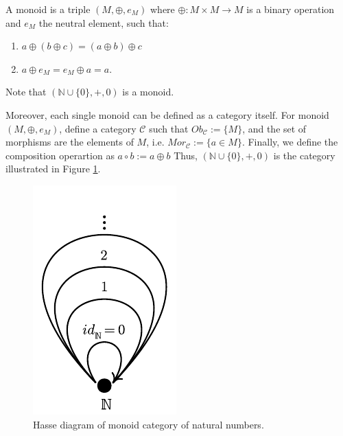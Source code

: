\begin{example}[Monoids]
	A monoid is a triple $(M, \oplus, e_M)$ where $\oplus:M\times M \to M$ is a binary operation
	and $e_M$ the neutral element, such that:
	\begin{enumerate}
		\item $a \oplus (b \oplus c) = (a \oplus b) \oplus c$
		\item $a \oplus e_M = e_M \oplus a = a$.
	\end{enumerate}
	Note that $(\mathbb N \cup\{ 0\}, +, 0)$ is a monoid.

	Moreover, each single monoid can be defined as a category itself. For
	monoid $(M, \oplus, e_M)$, define a category $\mathcal C$
	such that $Ob_\mathcal C := \{M\}$, and the set of morphisms
	are the elements of $M$, i.e.
	$Mor_\mathcal C := \{a \in M\}$. Finally, we define the composition
	operartion as $a \circ b := a \oplus b$
	Thus, $(\mathbb N \cup \{0\}, +, 0)$ is the category illustrated in
	Figure \ref{fig:NMonoid}.

	\begin{figure}[H]
		\begin{center}
			\includegraphics{./notebooks/NMonoid}
		\end{center}
		\caption{Hasse diagram of monoid category of natural numbers.}
		\label{fig:NMonoid}
	\end{figure}

\end{example}

